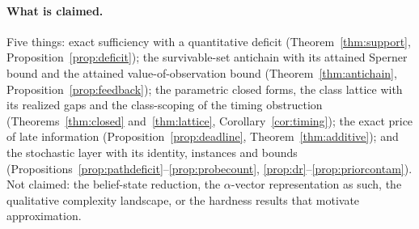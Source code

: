 \paragraph{What is claimed.}
Five things: exact sufficiency with a quantitative deficit (Theorem~\ref{thm:support}, Proposition~\ref{prop:deficit}); the survivable-set antichain with its attained Sperner bound and the attained value-of-observation bound (Theorem~\ref{thm:antichain}, Proposition~\ref{prop:feedback}); the parametric closed forms, the class lattice with its realized gaps and the class-scoping of the timing obstruction (Theorems~\ref{thm:closed} and~\ref{thm:lattice}, Corollary~\ref{cor:timing}); the exact price of late information (Proposition~\ref{prop:deadline}, Theorem~\ref{thm:additive}); and the stochastic layer with its identity, instances and bounds (Propositions~\ref{prop:pathdeficit}--\ref{prop:probecount}, \ref{prop:dr}--\ref{prop:priorcontam}). Not claimed: the belief-state reduction, the $\alpha$-vector representation as such, the qualitative complexity landscape, or the hardness results that motivate approximation.
